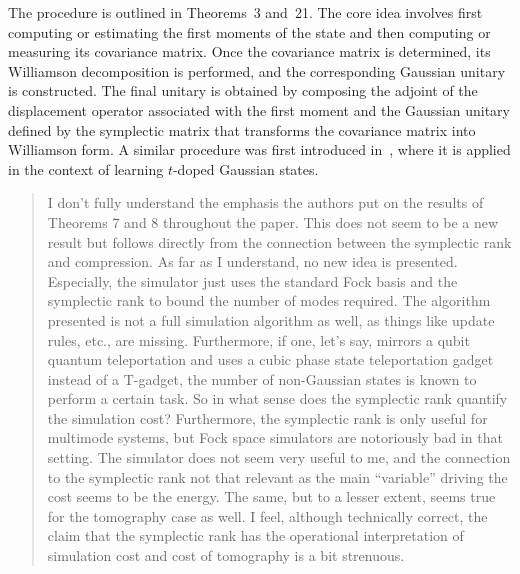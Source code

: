 \documentclass[a4paper,12pt]{article}
\newenvironment{Referee}[1]
{\noindent {\bf Comment #1:} \begin{quote} }
{\end{quote}\vspace{0 cm}}
\newenvironment{Response}
{\noindent \color{RawSienna}{\bf Response:} }
{\vspace{0.4 cm}}
\begin{document}
\begin{Response}
The procedure is outlined in Theorems~3 and~21. The core idea involves first computing or estimating the first moments of the state and then computing or measuring its covariance matrix. Once the covariance matrix is determined, its Williamson decomposition is performed, and the corresponding Gaussian unitary is constructed. The final unitary is obtained by composing the adjoint of the displacement operator associated with the first moment and the Gaussian unitary defined by the symplectic matrix that transforms the covariance matrix into Williamson form. A similar procedure was first introduced in~\cite{Mele_2025}, where it is applied in the context of learning $t$-doped Gaussian states.


\end{Response}

\begin{Referee}{6}
I don't fully understand the emphasis the authors put on the results of Theorems 7 and 8 throughout the paper. This does not seem to be a new result but follows directly from the connection between the symplectic rank and compression. As far as I understand, no new idea is presented. Especially, the simulator just uses the standard Fock basis and the symplectic rank to bound the number of modes required. The algorithm presented is not a full simulation algorithm as well, as things like update rules, etc., are missing. Furthermore, if one, let's say, mirrors a qubit quantum teleportation and uses a cubic phase state teleportation gadget instead of a T-gadget, the number of non-Gaussian states is known to perform a certain task. So in what sense does the symplectic rank quantify the simulation cost? Furthermore, the symplectic rank is only useful for multimode systems, but Fock space simulators are notoriously bad in that setting. The simulator does not seem very useful to me, and the connection to the symplectic rank not that relevant as the main ``variable'' driving the cost seems to be the energy. The same, but to a lesser extent, seems true for the tomography case as well. I feel, although technically correct, the claim that the symplectic rank has the operational interpretation of simulation cost and cost of tomography is a bit strenuous.
\end{Referee}
\end{document}
